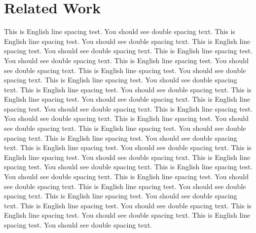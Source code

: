 \chapter{Related Work}
\label{c:related}


This is English line spacing test. You should see double spacing text.
This is English line spacing test. You should see double spacing text.
This is English line spacing test. You should see double spacing text.
This is English line spacing test. You should see double spacing text.
This is English line spacing test. You should see double spacing text.
This is English line spacing test. You should see double spacing text.
This is English line spacing test. You should see double spacing text.
This is English line spacing test. You should see double spacing text.
This is English line spacing test. You should see double spacing text.
This is English line spacing test. You should see double spacing text.
This is English line spacing test. You should see double spacing text.
This is English line spacing test. You should see double spacing text.
This is English line spacing test. You should see double spacing text.
This is English line spacing test. You should see double spacing text.
This is English line spacing test. You should see double spacing text.
This is English line spacing test. You should see double spacing text.
This is English line spacing test. You should see double spacing text.
This is English line spacing test. You should see double spacing text.
This is English line spacing test. You should see double spacing text.
This is English line spacing test. You should see double spacing text.
This is English line spacing test. You should see double spacing text.
This is English line spacing test. You should see double spacing text.
This is English line spacing test. You should see double spacing text.
This is English line spacing test. You should see double spacing text.


